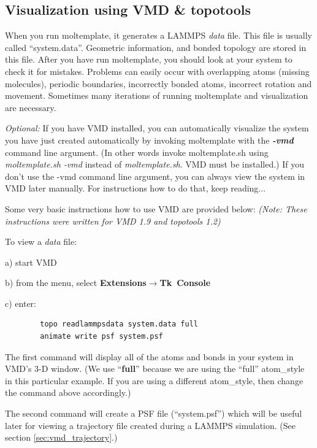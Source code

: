 \documentclass[11pt]{article}
\begin{document}
\subsection{Visualization using VMD \& topotools}
\label{sec:vmd_topotools}

When you run moltemplate, it generates a LAMMPS \textit{data} file. 
This file is usually called ``system.data''.
Geometric information, and bonded topology are stored in this file.
After you have run moltemplate, you should look at your system 
to check it for mistakes. 
Problems can easily occur with overlapping atoms (missing molecules), 
periodic boundaries, incorrectly bonded atoms, incorrect rotation and movement.
Sometimes many iterations of running moltemplate and 
visualization are necessary.  

\textit{Optional:}
If you have VMD installed, you can automatically visualize the system
you have just created automatically by invoking moltemplate with 
the \textit{\textbf{-vmd}} command line argument.
(In other words invoke moltemplate.sh using \textit{moltemplate.sh -vmd}
 instead of \textit{moltemplate.sh}.  VMD must be installed.)
If you don't use the -vmd command line argument, you can always view the 
system in VMD later manually.  For instructions how to do that, 
keep reading...

Some very basic instructions how to use VMD are provided below:
\textit{(Note: These instructions were written for VMD 1.9 and topotools 1.2)}

To view a \textit{data} file:
\begin{list}{}
\item a) start VMD
\item b) from the menu, select 
         \textbf{Extensions}$\rightarrow$\mbox{\textbf{Tk Console}} 
\item c) enter:
\end{list}
\begin{verbatim}
        topo readlammpsdata system.data full
        animate write psf system.psf
\end{verbatim}
\begin{list}{}
\item The first command will display all of the atoms and bonds in your system
in VMD's 3-D window.  (We use ``\textbf{full}'' because we are using the 
``full'' atom\_style in this particular example.  If you are using a different 
atom\_style, then change the command above accordingly.)
\item The second command
will create a PSF file (``system.psf'') which will 
be useful later for viewing a trajectory file created 
during a LAMMPS simulation.
(See section \ref{sec:vmd_trajectory}.)
\end{list}
\end{document}
